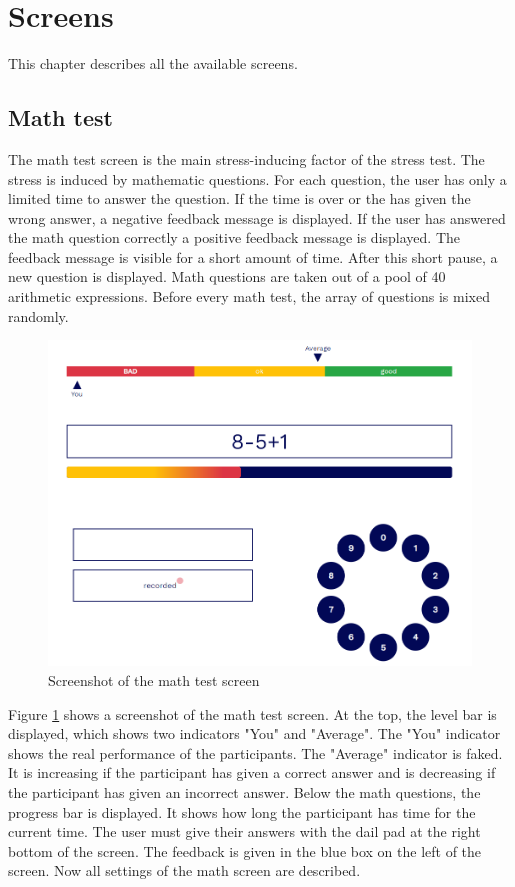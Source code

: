 \section{Screens}
\label{sec:screens}

This chapter describes all the available screens.

\subsection{Math test}
\label{sec:screens-math-test}

The math test screen is the main stress-inducing factor of the stress test.
The stress is induced by mathematic questions. 
For each question, the user has only a limited time to answer the question. 
If the time is over or the has given the wrong answer, a negative feedback message is displayed. 
If the user has answered the math question correctly a positive feedback message is displayed. 
The feedback message is visible for a short amount of time. 
After this short pause, a new question is displayed.
Math questions are taken out of a pool of 40 arithmetic expressions. 
Before every math test, the array of questions is mixed randomly.

\begin{figure}[htb]
  \centering
  \includegraphics[width=\textwidth]{figures/Math-test.png}
  \caption{Screenshot of the math test screen}
  \label{fig:screenshot-math-test-screen}
\end{figure}

Figure \ref{fig:screenshot-math-test-screen} shows a screenshot of the math test screen.
At the top, the level bar is displayed, which shows two indicators "You" and "Average".
The "You" indicator shows the real performance of the participants.
The "Average" indicator is faked.
It is increasing if the participant has given a correct answer and is decreasing if the participant has given an incorrect answer.
Below the math questions, the progress bar is displayed.
It shows how long the participant has time for the current time.
The user must give their answers with the dail pad at the right bottom of the screen.
The feedback is given in the blue box on the left of the screen.
Now all settings of the math screen are described.

